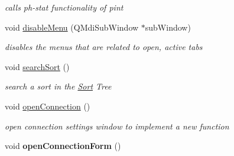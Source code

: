 \begin{DoxyCompactItemize}
\begin{DoxyCompactList}\small\item\em calls ph-\/stat functionality of pint \end{DoxyCompactList}\item 
void \hyperlink{classMainWindow_a5f56ea1ee38eb16074e654b8bd52d072}{disable\+Menu} (Q\+Mdi\+Sub\+Window $\ast$sub\+Window)
\begin{DoxyCompactList}\small\item\em disables the menus that are related to open, active tabs \end{DoxyCompactList}\item 
\hypertarget{classMainWindow_a3fbd0b3e2fb9008ffa476d79a951d3dd}{void \hyperlink{classMainWindow_a3fbd0b3e2fb9008ffa476d79a951d3dd}{search\+Sort} ()}\label{classMainWindow_a3fbd0b3e2fb9008ffa476d79a951d3dd}

\begin{DoxyCompactList}\small\item\em search a sort in the \hyperlink{classSort}{Sort} Tree \end{DoxyCompactList}\item 
\hypertarget{classMainWindow_a74bc22370f5443cd3ca04be2cbeca061}{void \hyperlink{classMainWindow_a74bc22370f5443cd3ca04be2cbeca061}{open\+Connection} ()}\label{classMainWindow_a74bc22370f5443cd3ca04be2cbeca061}

\begin{DoxyCompactList}\small\item\em open connection settings window to implement a new function \end{DoxyCompactList}\item 
\hypertarget{classMainWindow_ab0df9fa0819262a27793630c19824b5b}{void {\bfseries open\+Connection\+Form} ()}\label{classMainWindow_ab0df9fa0819262a27793630c19824b5b}

\end{DoxyCompactItemize}
